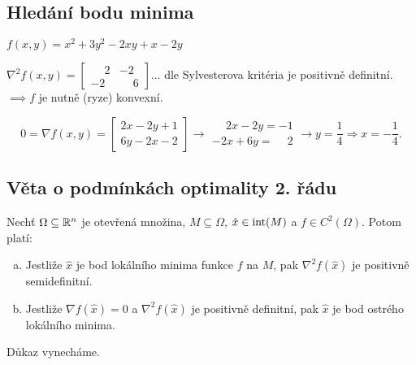\subsection{Hledání bodu minima}
$f(x, y) = x^2 + 3y^2 - 2xy + x - 2y$

$\nabla^2 f(x, y) =
\begin{bmatrix}
    \phantom{-}2 & -2 \\
    -2 & \phantom{-}6
\end{bmatrix} \dots$ dle Sylvesterova kritéria je positivně definitní. \\
$\implies f $ je nutně (ryze) konvexní.

\[
    0 = \nabla f(x, y) =
    \begin{bmatrix}
        2x-2y + 1 \\
        6y - 2x -2
    \end{bmatrix} \rightarrow
    \begin{matrix}
    \phantom{-}2x - 2y = -1 \\
    -2x + 6y = \phantom{-}2
    \end{matrix} \rightarrow y = \frac{1}{4} \Rightarrow x = -\frac{1}{4}.
\]

\subsection{Věta o podmínkách optimality 2. řádu}\label{podOpt2}
Nechť $\Omega \subseteq \mathbb{R}^n$ je otevřená množina, $M \subseteq \Omega$, $\hat x \in \operatorname*{int}(M)$ a $f \in C^2 (\Omega)$.
Potom platí:
\begin{enumerate}[(a)]
    \item Jestliže $\hat x$ je bod lokálního minima funkce $f$ na $M$, pak $\nabla^2 f(\hat x)$ je positivně
    semidefinitní.
    \item Jestliže $\nabla f(\hat x) = 0$ a $\nabla^2 f(\hat x)$ je positivně definitní, pak $\hat x$ je bod ostrého
    lokálního minima.
\end{enumerate}
Důkaz vynecháme.

